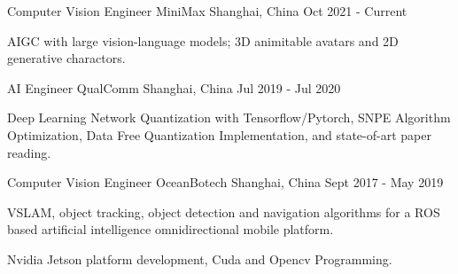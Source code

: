 

\begin{cventries}

  \cventry
    {Computer Vision Engineer} %
    {MiniMax} %
    {Shanghai, China} %
    {Oct 2021 - Current} %
    {
      \begin{cvitems} %
        \item {AIGC with large vision-language models; 3D animitable avatars and 2D generative charactors.}
      \end{cvitems}
    }

  \cventry
    {AI Engineer} %
    {QualComm} %
    {Shanghai, China} %
    {Jul 2019 - Jul 2020} %
    {
      \begin{cvitems} %
        \item {Deep Learning Network Quantization with Tensorflow/Pytorch, SNPE Algorithm Optimization, Data Free Quantization Implementation, and state-of-art paper reading.}
      \end{cvitems}
    }

  \cventry
    {Computer Vision Engineer} %
    {OceanBotech} %
    {Shanghai, China} %
    {Sept 2017 - May 2019} %
    {
      \begin{cvitems} %
        \item {VSLAM, object tracking, object detection and navigation algorithms for a ROS based artificial intelligence omnidirectional mobile platform.}
        \item {Nvidia Jetson platform development, Cuda and Opencv Programming.}
      \end{cvitems}}

\end{cventries}
